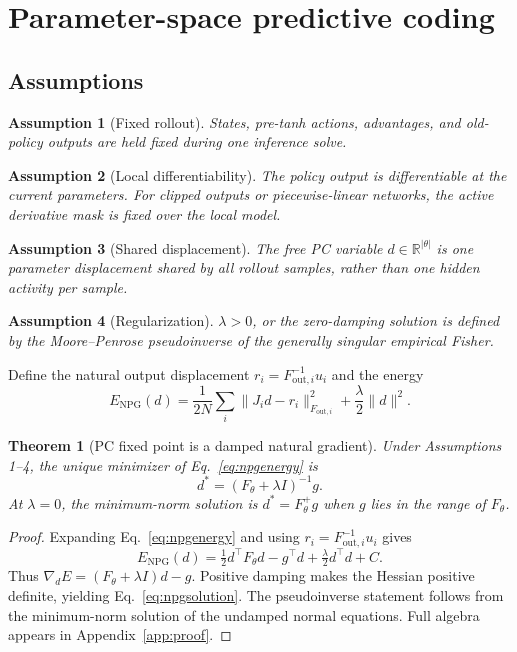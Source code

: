 \documentclass{article}
\newtheorem{theorem}{Theorem}
\newtheorem{assumption}{Assumption}
\newcommand{\Fouti}{F_{\mathrm{out},i}}
\newcommand{\Fpol}{F_{\theta}}
\newcommand{\R}{\mathbb{R}}
\begin{document}
\section{Parameter-space predictive coding}

\subsection{Assumptions}

\begin{assumption}[Fixed rollout]
States, pre-tanh actions, advantages, and old-policy outputs are held fixed during one inference solve.
\end{assumption}
\begin{assumption}[Local differentiability]
The policy output is differentiable at the current parameters. For clipped outputs or piecewise-linear networks, the active derivative mask is fixed over the local model.
\end{assumption}
\begin{assumption}[Shared displacement]
The free PC variable $d\in\R^{|\theta|}$ is one parameter displacement shared by all rollout samples, rather than one hidden activity per sample.
\end{assumption}
\begin{assumption}[Regularization]
$\lambda>0$, or the zero-damping solution is defined by the Moore--Penrose pseudoinverse of the generally singular empirical Fisher.
\end{assumption}

Define the natural output displacement $r_i=\Fouti^{-1}u_i$ and the energy
\begin{equation}
E_{\mathrm{NPG}}(d)=\frac{1}{2N}\sum_i\|J_id-r_i\|_{\Fouti}^2
+\frac\lambda2\|d\|^2.
\label{eq:npgenergy}
\end{equation}

\begin{theorem}[PC fixed point is a damped natural gradient]
Under Assumptions 1--4, the unique minimizer of Eq.~\eqref{eq:npgenergy} is
\begin{equation}
d^*=(\Fpol+\lambda I)^{-1}g.
\label{eq:npgsolution}
\end{equation}
At $\lambda=0$, the minimum-norm solution is $d^*=\Fpol^+g$ when $g$ lies in the range of $\Fpol$.
\end{theorem}
\begin{proof}
Expanding Eq.~\eqref{eq:npgenergy} and using $r_i=\Fouti^{-1}u_i$ gives
\begin{equation}
E_{\mathrm{NPG}}(d)=\tfrac12d^\top\Fpol d-g^\top d+\tfrac\lambda2d^\top d+C.
\end{equation}
Thus $\nabla_dE=(\Fpol+\lambda I)d-g$. Positive damping makes the Hessian positive definite, yielding Eq.~\eqref{eq:npgsolution}. The pseudoinverse statement follows from the minimum-norm solution of the undamped normal equations. Full algebra appears in Appendix~\ref{app:proof}.
\end{proof}
\end{document}
